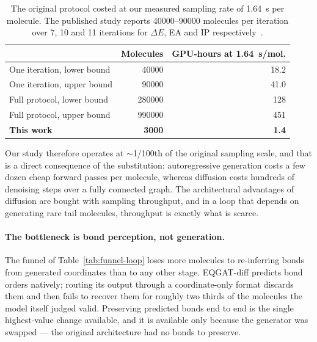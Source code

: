 \documentclass[runningheads]{llncs}
\begin{document}
\begin{table}[t]
\centering
\caption{The original protocol costed at our measured sampling rate of
\SI{1.64}{\second} per molecule. The published study reports
\numrange{40000}{90000} molecules per iteration over 7, 10 and 11
iterations for $\Delta E$, EA and IP respectively~\cite{westermayr2022}.}
\label{tab:cost}
\begin{tabular}{lrr}
\toprule
 & Molecules & GPU-hours at \SI{1.64}{\second}/mol. \\
\midrule
One iteration, lower bound  & \num{40000}   & \num{18.2} \\
One iteration, upper bound  & \num{90000}   & \num{41.0} \\
Full protocol, lower bound  & \num{280000}  & \num{128} \\
Full protocol, upper bound  & \num{990000}  & \num{451} \\
\midrule
\textbf{This work}          & \textbf{\num{3000}} & \textbf{\num{1.4}} \\
\bottomrule
\end{tabular}
\end{table}

 Our study therefore
operates at $\sim$1/100th of the original sampling scale, and that is a
direct consequence of the substitution: autoregressive generation costs
a few dozen cheap forward passes per molecule, whereas diffusion costs
hundreds of denoising steps over a fully connected graph. The
architectural advantages of diffusion are bought with sampling
throughput, and in a loop that depends on generating rare tail
molecules, throughput is exactly what is scarce.

\paragraph{The bottleneck is bond perception, not generation.} The
funnel of Table~\ref{tab:funnel-loop} loses more molecules to re-inferring
bonds from generated coordinates than to any other stage. EQGAT-diff
predicts bond orders natively; routing its output through a
coordinate-only format discards them and then fails to recover them for
roughly two thirds of the molecules the model itself judged valid. Preserving predicted bonds end to end is the single highest-value
change available, and it is available only because the generator was
swapped --- the original architecture had no bonds to preserve.
\end{document}
